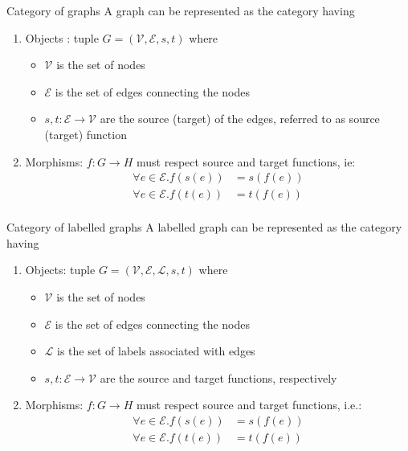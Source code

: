 \begin{example}{Category of graphs}
	A graph can be represented as the category having
	\begin{enumerate}
		\item Objects : tuple $G = (\mathcal{V},\mathcal{E},s,t)$ where
		\begin{itemize}
			\item $\mathcal{V}$ is the set of nodes
			\item $\mathcal{E}$ is the set of edges connecting the nodes
			\item $s, t : \mathcal{E}\rightarrow\mathcal{V}$ are the source (target) of the edges, referred to as source (target) function
		\end{itemize}
		\item Morphisms: $f : G \rightarrow H$ must respect source and target functions, ie:
		\begin{align*}
			\forall e \in \mathcal{E}.f(s(e)) &= s(f(e))\\
			\forall e \in \mathcal{E}.f(t(e)) &= t(f(e))\\
		\end{align*}
	\end{enumerate}
\end{example}
\begin{example}{Category of labelled graphs}
	A labelled graph can be represented as the category having
	\begin{enumerate}
		\item Objects: tuple $G = (\mathcal{V},\mathcal{E},\mathcal{L},s,t)$ where
		\begin{itemize}
			\item $\mathcal{V}$ is the set of nodes
			\item $\mathcal{E}$ is the set of edges connecting the nodes
			\item $\mathcal{L}$ is the set of labels associated with edges
			\item $s, t : \mathcal{E}\rightarrow\mathcal{V}$ are the source and target functions, respectively
		\end{itemize}
		\item Morphisms: $f : G \rightarrow H$ must respect source and target functions, i.e.:
		\begin{align*}
			\forall e \in \mathcal{E}.f(s(e)) &= s(f(e))\\
			\forall e \in \mathcal{E}.f(t(e)) &= t(f(e))
		\end{align*}
	\end{enumerate}
\end{example}


